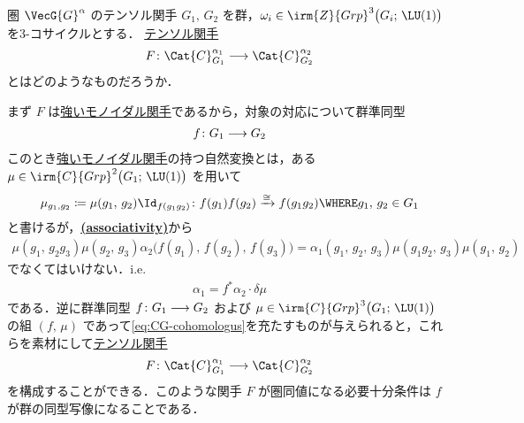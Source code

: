 \documentclass[TQFT_main]{subfiles}
\begin{document}
\begin{myexample}[label=def:CG-functor]{圏 $\VecG{G}^\alpha$ のテンソル関手}
    $G_1,\, G_2$ を群，$\omega_i \in \irm{Z}{Grp}^3 \bigl(G_i;\, \LU(1) \bigr)$ を3-コサイクルとする．
    \hyperref[def:tensor-functor]{テンソル関手} 
    \begin{align}
        F \colon \Cat{C}_{G_1}^{\alpha_1} \lto \Cat{C}_{G_2}^{\alpha_2}
    \end{align}
    とはどのようなものだろうか．

    まず $F$ は\hyperref[redef:monidal-functor]{強いモノイダル関手}であるから，対象の対応について群準同型
    \begin{align}
        f \colon G_1 \longrightarrow G_2
    \end{align}
    このとき\hyperref[redef:monidal-functor]{強いモノイダル関手}の持つ自然変換とは，ある $\mu \in \irm{C}{Grp}^2 \bigl( G_1;\, \LU(1) \bigr) $ を用いて
    \begin{align}
        \mu_{g_1,g_2} \coloneqq \mu(g_1,\, g_2) \Id_{f(g_1 g_2)} \colon f(g_1) f(g_2) \xrightarrow{\cong} f(g_1g_2) \WHERE g_1,\, g_2 \in G_1
    \end{align}
    と書けるが，\hyperref[redef:monidal-functor]{\textsf{\textbf{(associativity)}}}から
    \begin{align}
        \mu(g_1,\, g_2 g_3) \mu(g_2,\, g_3) \alpha_2 \bigl( f(g_1),\, f(g_2),\, f(g_3) \bigr) = \alpha_1 (g_1,\, g_2,\, g_3) \mu(g_1g_2,\, g_3) \mu(g_1,\, g_2)
    \end{align}
    でなくてはいけない．i.e. 
    \begin{align}
        \label{eq:CG-cohomologus}
        \alpha_1 = f^* \alpha_2 \cdot \delta \mu
    \end{align}
    である．逆に群準同型 $f \colon G_1 \longrightarrow G_2$ および $\mu \in \irm{C}{Grp}^3 \bigl( G_1;\, \LU(1) \bigr)$ の組 $(f,\, \mu)$ であって\eqref{eq:CG-cohomologus}を充たすものが与えられると，これらを素材にして\hyperref[def:tensor-functor]{テンソル関手} 
    \begin{align}
        F \colon \Cat{C}_{G_1}^{\alpha_1} \lto \Cat{C}_{G_2}^{\alpha_2}
    \end{align}
    を構成することができる．このような関手 $F$ が圏同値になる必要十分条件は $f$ が群の同型写像になることである．
\end{myexample}
\end{document}
